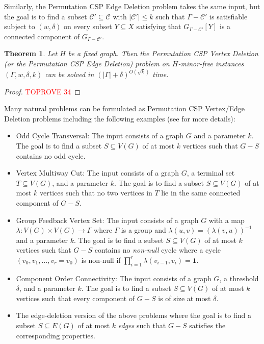 \documentclass[a4paper,11pt]{article}
\numberwithin{lemma}{section}
\newtheorem{theorem}[lemma]{Theorem}
\begin{document}
Similarly, the {\sc Permutation CSP Edge Deletion} problem takes the same input, but the goal is to find a subset $\mathcal{C}' \subseteq \mathcal{C}$ with $|\mathcal{C}'| \leq k$ such that $\varGamma - \mathcal{C}'$ is satisfiable subject to $(w,\delta)$ on every subset $Y \subseteq X$ satisfying that $G_{\varGamma - \mathcal{C}'}[Y]$ is a connected component of $G_{\varGamma - \mathcal{C}'}$.

\begin{theorem}\label{thm-permCSP}
 Let $H$ be a fixed graph.
 Then the {\sc Permutation CSP Vertex Deletion} (or the {\sc Permutation CSP Edge Deletion}) problem on $H$-minor-free instances $(\varGamma,w,\delta,k)$ can be solved in $(|\varGamma|+\delta)^{O(\sqrt{k})}$ time.
\end{theorem}

\begin{proof}\textcolor{red}{TOPROVE 34}\end{proof}

Many natural problems can be formulated as {\sc Permutation CSP Vertex/Edge Deletion} problems including the following examples (see \cite{MarxMNT22} for more details):
\begin{itemize}
 \item {\sc Odd Cycle Transversal}: The input consists of a graph $G$ and a parameter $k$. The goal is to find a subset $S \subseteq V(G)$ of at most $k$ vertices such that $G - S$ contains no odd cycle.
 \item {\sc Vertex Multiway Cut}: The input consists of a graph $G$, a terminal set $T \subseteq V(G)$, and a parameter $k$. The goal is to find a subset $S \subseteq V(G)$ of at most $k$ vertices such that no two vertices in $T$ lie in the same connected component of $G - S$.
 \item {\sc Group Feedback Vertex Set}: The input consists of a graph $G$ with a map $\lambda:V(G) \times V(G) \rightarrow \varGamma$ where $\varGamma$ is a group and $\lambda(u,v) = (\lambda(v,u))^{-1}$ and a parameter $k$. The goal is to find a subset $S \subseteq V(G)$ of at most $k$ vertices such that $G - S$ contains no \emph{non-null} cycle where a cycle $(v_0,v_1,\dots,v_r=v_0)$ is non-null if $\prod_{i=1}^r \lambda(v_{i-1},v_i) = \mathbf{1}$.
 \item {\sc Component Order Connectivity}: The input consists of a graph $G$, a threshold $\delta$, and a parameter $k$. The goal is to find a subset $S \subseteq V(G)$ of at most $k$ vertices such that every component of $G-S$ is of size at most $\delta$.
 \item The edge-deletion version of the above problems where the goal is to find a subset $S \subseteq E(G)$ of at most $k$ \emph{edges} such that $G-S$ satisfies the corresponding properties.
\end{itemize}
\end{document}
